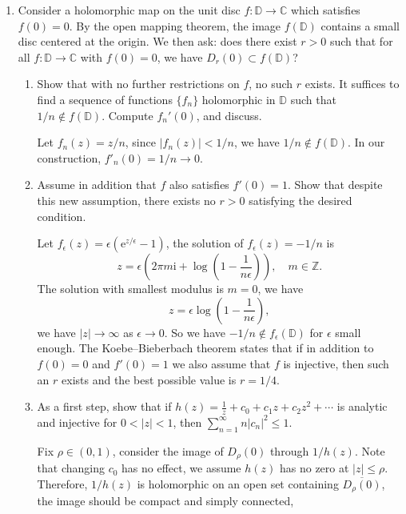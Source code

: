 \documentclass[11pt]{report}
\theoremstyle{mythm}
\let\oldendproof\endproof
\renewenvironment{proof}[1][\proofname]{%
  \oldproof[\normalfont \bfseries #1]%
}{\oldendproof}
\renewcommand*{\proofname}{Proof}
\theoremstyle{myans}
\newcommand{\mi}{\mathrm{i}}
\newcommand{\me}{\mathrm{e}}
\newcommand{\bbC}{\mathbb{C}}
\newcommand{\bbD}{\mathbb{D}}
\begin{document}
\begin{enumerate}
  \item Consider a holomorphic map on the unit disc $f \colon \bbD \to \bbC$ which satisfies $f(0) = 0$.
  By the open mapping theorem, the image $f(\bbD)$ contains a small disc centered at the origin.
  We then ask: does there exist $r > 0$ such that for all $f \colon \bbD \to \bbC$ with
  $f(0) = 0$, we have $D_r(0) \subset f(\bbD)$?
  \begin{enumerate}
    \item Show that with no further restrictions on $f$, no such $r$ exists. It suffices to find a
    sequence of functions $\{f_n\}$ holomorphic in $\bbD$ such that $1/n \notin f(\bbD)$. Compute
    $f_n'(0)$, and discuss.
    \begin{proof}
      Let $f_n(z) = z/n$, since $|f_n(z)| < 1/n$, we have $1/n\notin f(\bbD)$.
      In our construction, $f'_n(0)=1/n \to 0$.
    \end{proof}
    \item Assume in addition that $f$ also satisfies $f'(0) = 1$. Show that despite this new assumption,
    there exists no $r > 0$ satisfying the desired condition.
    \begin{proof}
      Let $f_\epsilon(z) = \epsilon(\me^{z/\epsilon}-1)$, the solution of $f_\epsilon(z)=-1/n$
      is
      \[ z = \epsilon \left( 2\pi m \mi + \log \left(1 - \frac 1{n\epsilon}\right) \right), \quad m\in\mathbb Z. \]
      The solution with smallest modulus is $m=0$, we have
      \[ z = \epsilon \log \left(1 - \frac 1{n\epsilon}\right), \]
      we have $|z|\to \infty$ as $\epsilon\to 0$. So we have $-1/n\notin f_\epsilon(\bbD)$ for $\epsilon$
      small enough.
    \end{proof}
    The Koebe--Bieberbach theorem states that if in addition to $f(0) = 0$ and $f'(0) = 1$ we also
    assume that $f$ is injective, then such an $r$ exists and the best possible value is $r = 1/4$.
    \item As a first step, show that if $h(z) = \frac 1 z + c_0 + c_1 z + c_2z^2 + \cdots$ is analytic and
    injective for $0 < |z| < 1$, then $\sum_{n=1}^\infty n |c_n|^2 \leq 1$. \label{area}
    \begin{proof}
      Fix $\rho\in (0, 1)$, consider the image of $D_\rho(0)$ through $1/h(z)$. Note that changing $c_0$ has no effect,
      we assume $h(z)$ has no zero at $|z| \leq \rho$. Therefore, $1/h(z)$ is holomorphic
      on an open set containing $\overline{D_\rho(0)}$, the image should be compact and simply connected,

\end{proof}
\end{enumerate}
\end{enumerate}
\end{document}
